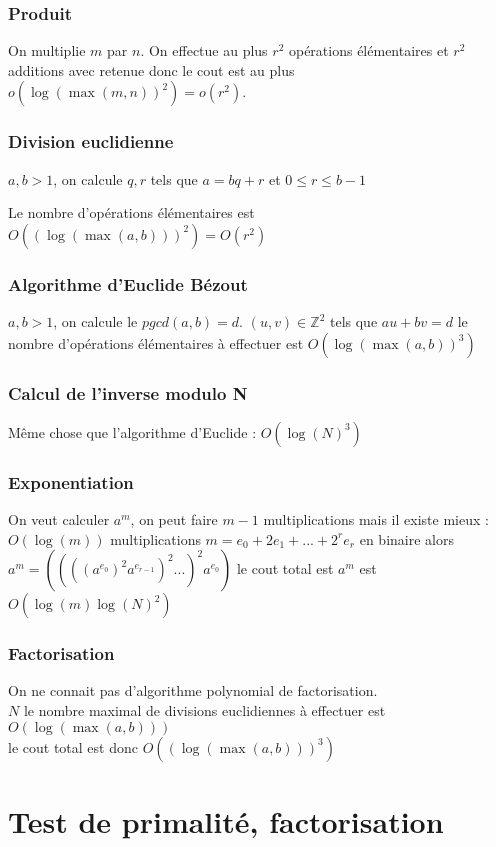 \documentclass[a4paper,10pt]{book} %
\newcommand{\Z}{\mathbb{Z}}
\begin{document}
\subsubsection{Produit}
On multiplie $m$ par $n$. On effectue au plus $r^2$ opérations élémentaires et $r^2$ additions avec retenue donc le cout est au plus $o(\log(\max(m,n))^2)=o(r^2)$.

\subsubsection{Division euclidienne}
$a,b>1$, on calcule $q,r$ tels que $a=bq+r$ et $0\leq r\leq b-1$

Le nombre d'opérations élémentaires est $O((\log(\max(a,b)))^2)=O(r^2)$

\subsubsection{Algorithme d'Euclide Bézout}
$a,b>1$, on calcule le $pgcd(a,b)=d$. $(u,v)\in \Z^2$ tels que $au+bv=d$
le nombre d'opérations élémentaires à effectuer est $O(\log(\max(a,b))^3)$

\subsubsection{Calcul de l'inverse modulo N}
Même chose que l'algorithme d'Euclide : $O(\log(N)^3)$

\subsubsection{Exponentiation}
On veut calculer $a^m$, on peut faire $m-1$ multiplications
mais il existe mieux : $O(\log(m))$ multiplications
$m=e_0+2e_1+...+2^re_r$ en binaire
alors $a^m=((((a^{e_0})^2a^{e_{r-1}})^2...)^2a^{e_0})$
le cout total est $a^m$ est $O(\log(m)\log(N)^2)$

\subsubsection{Factorisation}
On ne connait pas d'algorithme polynomial de factorisation.\\
$N$ le nombre maximal de divisions euclidiennes à effectuer est $O(\log(\max(a,b)))$\\
le cout total est donc $O((\log(\max(a,b)))^3)$

\section{Test de primalité, factorisation}
\end{document}
